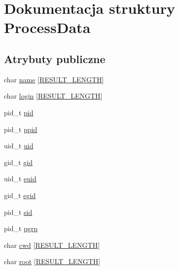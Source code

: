 \hypertarget{structProcessData}{}\section{Dokumentacja struktury Process\+Data}
\label{structProcessData}
\subsection*{Atrybuty publiczne}
\begin{DoxyCompactItemize}
\item 
char \mbox{\hyperlink{structProcessData_a5d84de63440da098dfc175f7c1b00a0a}{name}} \mbox{[}\mbox{\hyperlink{z6__13_8c_ad9699f597384c01411e910aae4c75b3f}{R\+E\+S\+U\+L\+T\+\_\+\+L\+E\+N\+G\+TH}}\mbox{]}
\item 
char \mbox{\hyperlink{structProcessData_aeb73bc4a8e7a30bab38651e312852d93}{login}} \mbox{[}\mbox{\hyperlink{z6__13_8c_ad9699f597384c01411e910aae4c75b3f}{R\+E\+S\+U\+L\+T\+\_\+\+L\+E\+N\+G\+TH}}\mbox{]}
\item 
pid\+\_\+t \mbox{\hyperlink{structProcessData_a5596b2aa9dfd6283ee07d13a4b1eb143}{pid}}
\item 
pid\+\_\+t \mbox{\hyperlink{structProcessData_a00297f9da3dc97fe7d41dc3b18fa594f}{ppid}}
\item 
uid\+\_\+t \mbox{\hyperlink{structProcessData_a73e7070d8329555a3cb19a499acaa774}{uid}}
\item 
gid\+\_\+t \mbox{\hyperlink{structProcessData_a60685a05ebcf313b1e7640f39ca10bf3}{gid}}
\item 
uid\+\_\+t \mbox{\hyperlink{structProcessData_afb93982f19036141a8510ad1222133bc}{euid}}
\item 
gid\+\_\+t \mbox{\hyperlink{structProcessData_a1881e7c254d2ef158e26ea23a7f238b3}{egid}}
\item 
pid\+\_\+t \mbox{\hyperlink{structProcessData_ae2b682ccbe7479d5b39fb772d4758163}{sid}}
\item 
pid\+\_\+t \mbox{\hyperlink{structProcessData_ab788720e14bef99483bfa794f28dd789}{pgrp}}
\item 
char \mbox{\hyperlink{structProcessData_a72e52a2fba172b6e53c28e5d3dbdcf22}{cwd}} \mbox{[}\mbox{\hyperlink{z6__13_8c_ad9699f597384c01411e910aae4c75b3f}{R\+E\+S\+U\+L\+T\+\_\+\+L\+E\+N\+G\+TH}}\mbox{]}
\item 
char \mbox{\hyperlink{structProcessData_ab7cbd839b3f7fe368b510eb77406ce02}{root}} \mbox{[}\mbox{\hyperlink{z6__13_8c_ad9699f597384c01411e910aae4c75b3f}{R\+E\+S\+U\+L\+T\+\_\+\+L\+E\+N\+G\+TH}}\mbox{]}

\end{DoxyCompactItemize}

